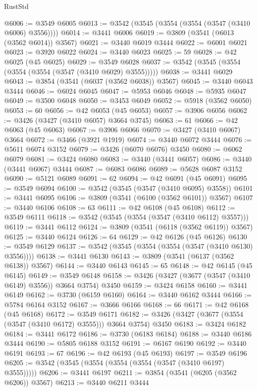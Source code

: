 \begin{lexlean}{RustStd}
\begin{coremodule}
@6006 := @3549 @6005
@6013 := @3542 (@3545 (@3554 (@3554 (@3547 (@3410 @6006) @3556))))
@6014 := @3441 @6006
@6019 := @3809 (@3541 (@6013 (@3562 @6014)) @3567)
@6021 := @3440 @6019 @3444
@6022 := @6001 @6021
@6023 := @3920 @6022
@6024 := @3440 @6023
@6025 := 59
@6028 := @42 @6025 (@45 @6025)
@6029 := @3549 @6028
@6037 := @3542 (@3545 (@3554 (@3554 (@3554 (@3547 (@3410 @6029) @3555)))))
@6038 := @3441 @6029
@6043 := @3854 (@3541 (@6037 (@3562 @6038)) @3567)
@6045 := @3440 @6043 @3444
@6046 := @6024 @6045
@6047 := @5953 @6046
@6048 := @5935 @6047
@6049 := @3500 @6048
@6050 := @3453 @6049
@6052 := @5918 (@3562 @6050)
@6053 := 60
@6056 := @42 @6053 (@45 @6053)
@6057 := @3906 @6056
@6062 := @3426 (@3427 (@3410 @6057) @3664 @3745)
@6063 := 61
@6066 := @42 @6063 (@45 @6063)
@6067 := @3906 @6066
@6070 := @3427 (@3410 @6067) @3664
@6072 := @3466 (@3921 @1919)
@6074 := @3440 @6072 @3444
@6076 := @5611 @6074 @3152
@6079 := @3426 (@6070 @6076) @3450
@6080 := @6062 @6079
@6081 := @3424 @6080
@6083 := @3440 (@3441 @6057)
@6086 := @3440 (@3441 @6067) @3444
@6087 := @6083 @6086
@6089 := @5628 @6087 @3152
@6090 := @5121 @6089
@6091 := 62
@6094 := @42 @6091 (@45 @6091)
@6095 := @3549 @6094
@6100 := @3542 (@3545 (@3547 (@3410 @6095) @3558))
@6101 := @3441 @6095
@6106 := @3809 (@3541 (@6100 (@3562 @6101)) @3567)
@6107 := @3440 @6106
@6108 := 63
@6111 := @42 @6108 (@45 @6108)
@6112 := @3549 @6111
@6118 := @3542 (@3545 (@3554 (@3547 (@3410 @6112) @3557)))
@6119 := @3441 @6112
@6124 := @3809 (@3541 (@6118 (@3562 @6119)) @3567)
@6125 := @3440 @6124
@6126 := 64
@6129 := @42 @6126 (@45 @6126)
@6130 := @3549 @6129
@6137 := @3542 (@3545 (@3554 (@3554 (@3547 (@3410 @6130) @3556))))
@6138 := @3441 @6130
@6143 := @3809 (@3541 (@6137 (@3562 @6138)) @3567)
@6144 := @3440 @6143
@6145 := 65
@6148 := @42 @6145 (@45 @6145)
@6149 := @3549 @6148
@6158 := @3426 (@3427 (@3677 (@3547 (@3410 @6149) @3556)) @3664 @3754) @3450
@6159 := @3424 @6158
@6160 := @3441 @6149
@6162 := @3730 (@6159 @6160)
@6164 := @3440 @6162 @3444
@6166 := @5784 @6164 @3152
@6167 := @3666 @6166
@6168 := 66
@6171 := @42 @6168 (@45 @6168)
@6172 := @3549 @6171
@6182 := @3426 (@3427 (@3677 (@3554 (@3547 (@3410 @6172) @3555))) @3664 @3754) @3450
@6183 := @3424 @6182
@6184 := @3441 @6172
@6186 := @3730 (@6183 @6184)
@6188 := @3440 @6186 @3444
@6190 := @5805 @6188 @3152
@6191 := @6167 @6190
@6192 := @3440 @6191
@6193 := 67
@6196 := @42 @6193 (@45 @6193)
@6197 := @3549 @6196
@6205 := @3542 (@3545 (@3554 (@3554 (@3554 (@3547 (@3410 @6197) @3555)))))
@6206 := @3441 @6197
@6211 := @3854 (@3541 (@6205 (@3562 @6206)) @3567)
@6213 := @3440 @6211 @3444

\end{coremodule}
\end{lexlean}
